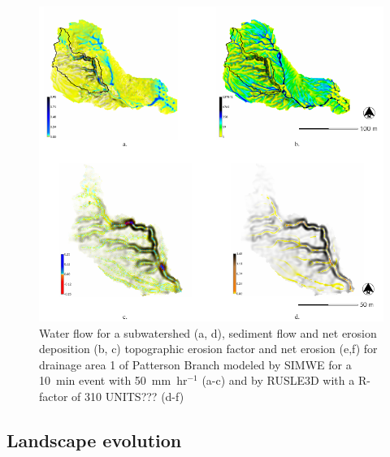 \documentclass[gmd, manuscript]{copernicus}
\begin{document}


\begin{figure}
\center
\includegraphics[width=\textwidth,height=0.95\textheight,keepaspectratio]{figures/models.pdf}
\caption{Water flow for a subwatershed (a, d), 
sediment flow and net erosion deposition (b, c)
topographic erosion factor and net erosion (e,f) for
drainage area 1 of Patterson Branch
modeled by SIMWE 
for a 10~\unit{min} event with 50~\unit{mm~hr}$^{-1}$ (a-c)
and by RUSLE3D with a R-factor of 310 UNITS??? 
(d-f)
}
\label{fig:models}
\end{figure}


\subsection{Landscape evolution}
\end{document}

